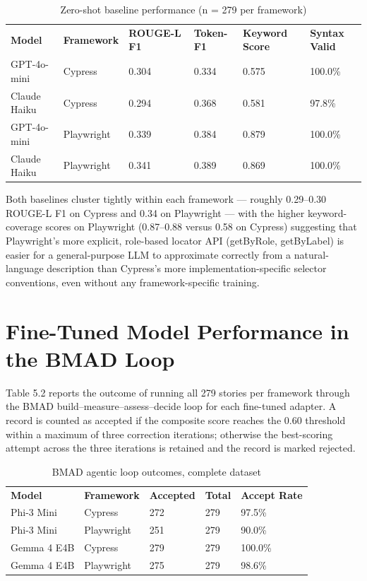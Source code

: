 \begin{longtable}[]{@{}llllll@{}}
\caption{Zero-shot baseline performance (n = 279 per framework)}\tabularnewline
\toprule
\endhead
\textbf{Model} & \textbf{Framework} & \textbf{ROUGE-L F1} &
\textbf{Token-F1} & \textbf{Keyword Score} & \textbf{Syntax Valid} \\
GPT-4o-mini & Cypress & 0.304 & 0.334 & 0.575 & 100.0\% \\
Claude Haiku & Cypress & 0.294 & 0.368 & 0.581 & 97.8\% \\
GPT-4o-mini & Playwright & 0.339 & 0.384 & 0.879 & 100.0\% \\
Claude Haiku & Playwright & 0.341 & 0.389 & 0.869 & 100.0\% \\
\bottomrule
\end{longtable}

Both baselines cluster tightly within each framework --- roughly
0.29--0.30 ROUGE-L F1 on Cypress and 0.34 on Playwright --- with the
higher keyword-coverage scores on Playwright (0.87--0.88 versus 0.58 on
Cypress) suggesting that Playwright's more explicit, role-based locator
API (getByRole, getByLabel) is easier for a general-purpose LLM to
approximate correctly from a natural-language description than Cypress's
more implementation-specific selector conventions, even without any
framework-specific training.

\section{Fine-Tuned Model Performance in the BMAD Loop}

Table 5.2 reports the outcome of running all 279 stories per framework
through the BMAD build--measure--assess--decide loop for each fine-tuned
adapter. A record is counted as accepted if the composite score reaches
the 0.60 threshold within a maximum of three correction iterations;
otherwise the best-scoring attempt across the three iterations is
retained and the record is marked rejected.

\begin{longtable}[]{@{}lllll@{}}
\caption{BMAD agentic loop outcomes, complete dataset}\tabularnewline
\toprule
\endhead
\textbf{Model} & \textbf{Framework} & \textbf{Accepted} & \textbf{Total}
& \textbf{Accept Rate} \\
Phi-3 Mini & Cypress & 272 & 279 & 97.5\% \\
Phi-3 Mini & Playwright & 251 & 279 & 90.0\% \\
Gemma 4 E4B & Cypress & 279 & 279 & 100.0\% \\
Gemma 4 E4B & Playwright & 275 & 279 & 98.6\% \\
\bottomrule
\end{longtable}

